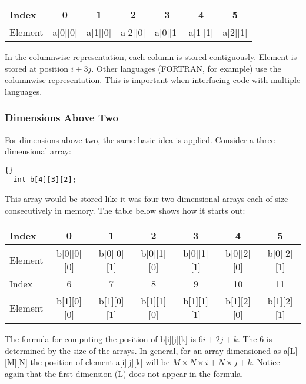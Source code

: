 \parbox{\textwidth}{
\vspace{0.5em}
\centering
\begin{tabular}{||l|c|c|c|c|c|c||}
\hline
Index & 0 & 1 & 2 & 3 & 4 & 5 \\
\hline
Element & a[0][0] & a[1][0] & a[2][0] & a[0][1] & a[1][1] & a[2][1]  \\
\hline
\end{tabular}
\vspace{0.5em}
}
\noindent In the columnwise representation, each column is stored contiguously. 
Element {\code [i][j]} is stored at position $i + 3j$. Other languages
(FORTRAN, for example) use the columnwise representation. This is
important when interfacing code with multiple languages.

\subsubsection{Dimensions Above Two}
For dimensions above two, the same basic idea is applied. Consider a three
dimensional array:
\begin{lstlisting}[stepnumber=0]{}
  int b[4][3][2];
\end{lstlisting}
This array would be stored like it was four two dimensional arrays each of size
{\code [3][2]} consecutively in memory. The table below shows how it starts out:

\parbox{\textwidth}{
\vspace{0.5em}
\centering
\begin{tabular}{||l|c|c|c|c|c|c||}
\hline
Index & 0 & 1 & 2 & 3 & 4 & 5  \\
\hline
Element & b[0][0][0] & b[0][0][1]  & b[0][1][0] & b[0][1][1] & b[0][2][0]
&  b[0][2][1]  \\
\hline
\hline
Index & 6 & 7 & 8 & 9 & 10 & 11 \\
\hline
Element & b[1][0][0] & b[1][0][1] & b[1][1][0] & b[1][1][1]  & b[1][2][0] 
& b[1][2][1] \\
\hline
\end{tabular}
\vspace{0.5em}
}
\noindent The formula for computing the position of {\code b[i][j][k]}
is $6i + 2j + k$. The 6 is determined by the size of the {\code
[3][2]} arrays. In general, for an array dimensioned as {\code
a[L][M][N]} the position of element {\code a[i][j][k]} will be $M\times N\times i 
+ N \times j + k$. Notice again that the first
dimension ({\code L}) does not appear in the formula.

